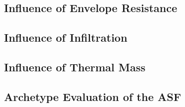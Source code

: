 
\subsection{Influence of Envelope Resistance}

\subsection{Influence of Infiltration}

\subsection{Influence of Thermal Mass}

\subsection{Archetype Evaluation of the ASF}